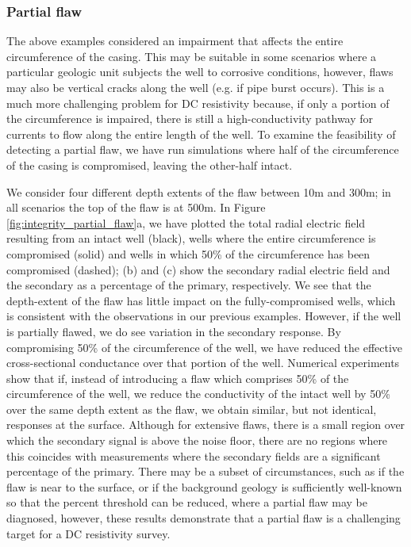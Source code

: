 





\subsubsection{Partial flaw}
The above examples considered an impairment that affects the entire circumference of the casing. This may be suitable in some scenarios where a particular geologic unit subjects the well to corrosive conditions, however, flaws may also be vertical cracks along the well (e.g. if pipe burst occurs). This is a much more challenging problem for DC resistivity because, if only a portion of the circumference is impaired, there is still a high-conductivity pathway for currents to flow along the entire length of the well. To examine the feasibility of detecting a partial flaw, we have run simulations where half of the circumference of the casing is compromised, leaving the other-half intact.

We consider four different depth extents of the flaw between 10m and 300m; in all scenarios the top of the flaw is at 500m. In Figure \ref{fig:integrity_partial_flaw}a, we have plotted the total radial electric field resulting from an intact well (black), wells where the entire circumference is compromised (solid) and wells in which 50\% of the circumference has been compromised (dashed); (b) and (c) show the secondary radial electric field and the secondary as a percentage of the primary, respectively. We see that the depth-extent of the flaw has little impact on the fully-compromised wells, which is consistent with the observations in our previous examples. However, if the well is partially flawed, we do see variation in the secondary response. By compromising 50\% of the circumference of the well, we have reduced the effective cross-sectional conductance over that portion of the well. Numerical experiments show that if, instead of introducing a flaw which comprises 50\% of the circumference of the well, we reduce the conductivity of the intact well by 50\% over the same depth extent as the flaw, we obtain similar, but not identical, responses at the surface. Although for extensive flaws, there is a small region over which the secondary signal is above the noise floor, there are no regions where this coincides with measurements where the secondary fields are a significant percentage of the primary. There may be a subset of circumstances, such as if the flaw is near to the surface, or if the background geology is sufficiently well-known so that the percent threshold can be reduced, where a partial flaw may be diagnosed, however, these results demonstrate that a partial flaw is a challenging target for a DC resistivity survey.



